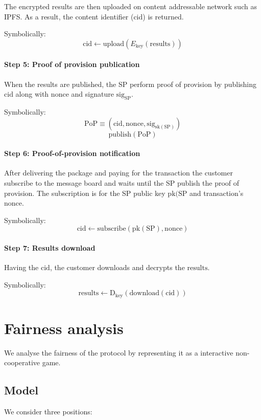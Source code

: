 \documentclass{ieeeaccess}
\begin{document}
The encrypted results are then uploaded on content addressable network such as IPFS. As a result, the content identifier (cid) is returned.

Symbolically: 
\[
\mathrm{cid} \gets \mathrm{upload}(E_{\mathrm{key}}(\mathrm{results}))
\]

\paragraph{Step 5: Proof of provision
publication}\label{step-5-proof-of-provision-publication}

When the results are published, the SP perform proof of provision by publishing $\mathrm{cid}$ along with $\mathrm{nonce}$ and signature $\mathrm{sig}_\mathrm{SP}$.

Symbolically: 
\[\mathrm{PoP} \equiv (\mathrm{cid}, \mathrm{nonce}, \mathrm{sig}_{\mathrm{sk}(\mathrm{SP})})\]
\[\mathrm{publish}(\mathrm{PoP})\]

\paragraph{Step 6: Proof-of-provision
notification}\label{step-6-proof-of-provision-notification}

After delivering the package and paying for the transaction the customer subscribe to the message board and waits until the SP publish the proof of provision. The subscription is for the SP public key $\mathrm{pk}(\mathrm{SP}$ and transaction's $\mathrm{nonce}$.

Symbolically: \[
\mathrm{cid} \gets \mathrm{subscribe}(\mathrm{pk}(\mathrm{SP}), \mathrm{nonce})
\]

\paragraph{Step 7: Results download}\label{step-7-results-download}
Having the $\mathrm{cid}$, the customer downloads and decrypts the $\mathrm{results}$.

Symbolically: \[
\mathrm{results} \gets \mathrm{D}_{\mathrm{key}}(\mathrm{download}(\mathrm{cid}))
\]


\section{Fairness analysis}
We analyse the fairness of the protocol by representing it as a interactive non-cooperative game.

\subsection{Model}\label{model}
We consider three positions:
\end{document}
